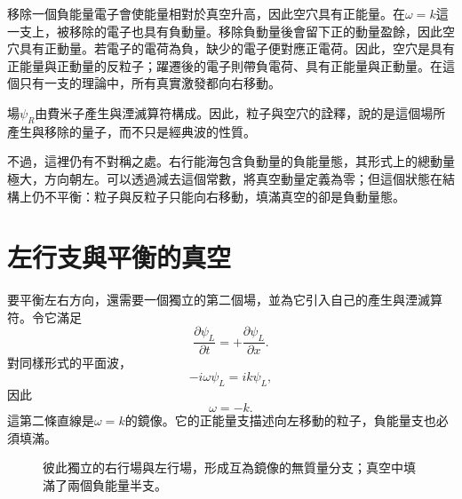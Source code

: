 移除一個負能量電子會使能量相對於真空升高，因此空穴具有正能量。在\(\omega=k\)這一支上，被移除的電子也具有負動量。移除負動量後會留下正的動量盈餘，因此空穴具有正動量。若電子的電荷為負，缺少的電子便對應正電荷。因此，空穴是具有正能量與正動量的反粒子；躍遷後的電子則帶負電荷、具有正能量與正動量。在這個只有一支的理論中，所有真實激發都向右移動。

場\(\psi_R\)由費米子產生與湮滅算符構成。因此，粒子與空穴的詮釋，說的是這個場所產生與移除的量子，而不只是經典波的性質。

不過，這裡仍有不對稱之處。右行能海包含負動量的負能量態，其形式上的總動量極大，方向朝左。可以透過減去這個常數，將真空動量定義為零；但這個狀態在結構上仍不平衡：粒子與反粒子只能向右移動，填滿真空的卻是負動量態。

\section{左行支與平衡的真空}

要平衡左右方向，還需要一個獨立的第二個場，並為它引入自己的產生與湮滅算符。令它滿足
\begin{equation}
\frac{\partial\psi_L}{\partial t}
=
+\frac{\partial\psi_L}{\partial x}.
\end{equation}
對同樣形式的平面波，
\begin{equation}
-i\omega\psi_L=ik\psi_L,
\end{equation}
因此
\begin{equation}
\omega=-k.
\end{equation}
這第二條直線是\(\omega=k\)的鏡像。它的正能量支描述向左移動的粒子，負能量支也必須填滿。

\begin{figure}[htbp]
\centering
{}
\caption{彼此獨立的右行場與左行場，形成互為鏡像的無質量分支；真空中填滿了兩個負能量半支。}
\end{figure}

